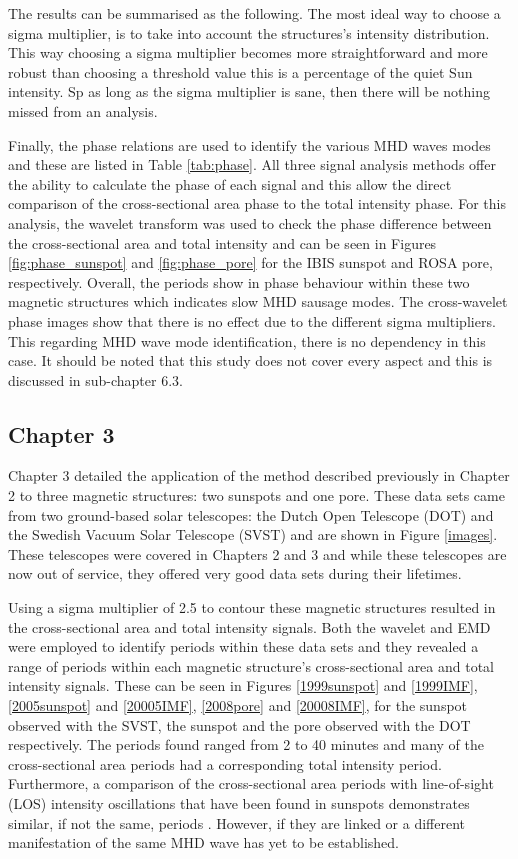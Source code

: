     The results can be summarised as the following.
    The most ideal way to choose a sigma multiplier, is to take into account the structures's intensity distribution.
    This way choosing a sigma multiplier becomes more straightforward and more robust than choosing a threshold value this is a percentage of the quiet Sun intensity.
    Sp as long as the sigma multiplier is sane, then there will be nothing missed from an analysis.
    
    Finally, the phase relations are used to identify the various MHD waves modes and these are listed in Table \ref{tab:phase}.
    All three signal analysis methods offer the ability to calculate the phase of each signal and this allow the direct comparison of the cross-sectional area phase to the total intensity phase.
    For this analysis, the wavelet transform was used to check the phase difference between the cross-sectional area and total intensity and can be seen in Figures \ref{fig:phase_sunspot} and \ref{fig:phase_pore} for the IBIS sunspot and ROSA pore, respectively.
    Overall, the periods show in phase behaviour within these two magnetic structures which indicates slow MHD sausage modes. 
    The cross-wavelet phase images show that there is no effect due to the different sigma multipliers. 
    This regarding MHD wave mode identification, there is no dependency in this case.
    It should be noted that this study does not cover every aspect and this is discussed in sub-chapter 6.3.

   	\subsection{Chapter 3}
    	
    Chapter 3 detailed the application of the method described previously in Chapter 2 to three magnetic structures: two sunspots and one pore.
    These data sets came from two ground-based solar telescopes: the Dutch Open Telescope (DOT) and the Swedish Vacuum Solar Telescope (SVST) and are shown in Figure \ref{images}.
    These telescopes were covered in Chapters 2 and 3 and while these telescopes are now out of service, they offered very good data sets during their lifetimes.
    
    Using a sigma multiplier of 2.5 to contour these magnetic structures resulted in the cross-sectional area and total intensity signals.
    Both the wavelet and EMD were employed to identify periods within these data sets and they revealed a range of periods within each magnetic structure's cross-sectional area and total intensity signals.
    These can be seen in Figures \ref{1999sunspot} and \ref{1999IMF}, \ref{2005sunspot} and \ref{20005IMF}, \ref{2008pore} and \ref{20008IMF}, for the sunspot observed with the SVST, the sunspot and the pore observed with the DOT respectively.
    The periods found ranged from 2 to 40 minutes and many of the cross-sectional area periods had a corresponding total intensity period.
    Furthermore, a comparison of the cross-sectional area periods with line-of-sight (LOS) intensity oscillations that have been found in sunspots demonstrates similar, if not the same, periods \citep{kobanov}.
    However, if they are linked or a different manifestation of the same MHD wave has yet to be established.
   
